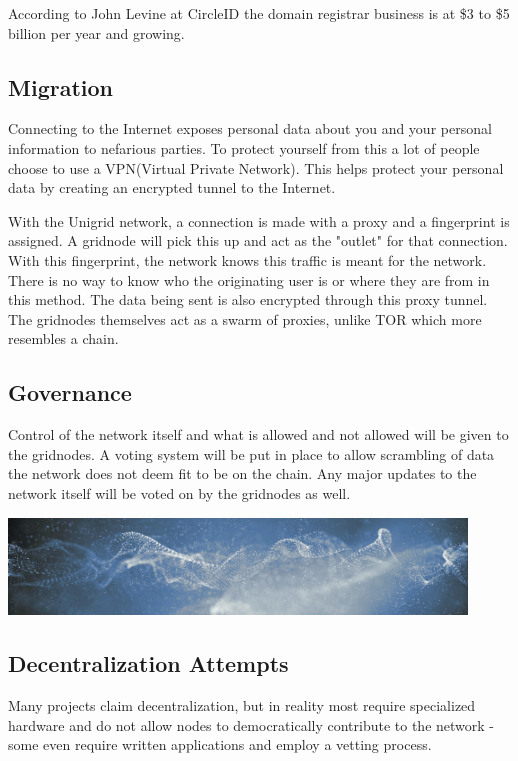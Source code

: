 \documentclass{article}
\begin{document}
According to John Levine at CircleID \cite{john2018} the domain registrar business is at \$3 to \$5 billion per year and growing.

\subsection{Migration}
Connecting to the Internet exposes personal data about you and your personal information to nefarious parties. To protect yourself from this a lot of people choose to use a VPN(Virtual Private Network). This helps protect your personal data by creating an encrypted tunnel to the Internet.

With the Unigrid network, a connection is made with a proxy and a fingerprint is assigned. A gridnode will pick this up and act as the "outlet" for that connection. With this fingerprint, the network knows this traffic is meant for the network. There is no way to know who the originating user is or where they are from in this method. The data being sent is also encrypted through this proxy tunnel. The gridnodes themselves act as a swarm of proxies, unlike TOR which more resembles a chain.

\subsection{Governance}
Control of the network itself and what is allowed and not allowed will be given to the gridnodes. A voting system will be put in place to allow scrambling of data the network does not deem fit to be on the chain. Any major updates to the network itself will be voted on by the gridnodes as well.
\begin{mdframed}[style=textimage]
	\includegraphics[width=345pt]{abstract-particles}
\end{mdframed}
\subsection{Decentralization Attempts}
Many projects claim decentralization, but in reality most require specialized hardware and do not allow nodes to democratically contribute to the network - some even require written applications and employ a vetting process.
\end{document}
